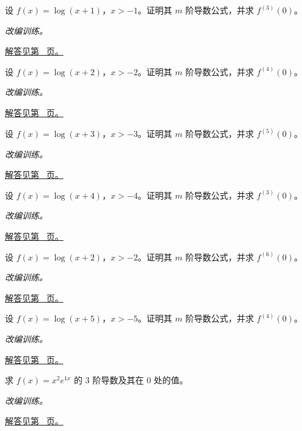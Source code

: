 \documentclass[UTF8,12pt,a4paper,fontset=fandol]{ctexart}
\begin{document}
\begin{example}[对数的高阶导数]\label{ex:c9q13}
设 $f(x)=\log(x+1)$，$x>-1$。证明其 $m$ 阶导数公式，并求 $f^{(3)}(0)$。
\par\textit{改编训练。}\par\hyperref[ans:c9q13]{解答见第~\pageref{ans:c9q13} 页。}
\end{example}
\begin{example}[对数的高阶导数]\label{ex:c9q14}
设 $f(x)=\log(x+2)$，$x>-2$。证明其 $m$ 阶导数公式，并求 $f^{(4)}(0)$。
\par\textit{改编训练。}\par\hyperref[ans:c9q14]{解答见第~\pageref{ans:c9q14} 页。}
\end{example}
\begin{example}[对数的高阶导数]\label{ex:c9q15}
设 $f(x)=\log(x+3)$，$x>-3$。证明其 $m$ 阶导数公式，并求 $f^{(5)}(0)$。
\par\textit{改编训练。}\par\hyperref[ans:c9q15]{解答见第~\pageref{ans:c9q15} 页。}
\end{example}
\begin{example}[对数的高阶导数]\label{ex:c9q16}
设 $f(x)=\log(x+4)$，$x>-4$。证明其 $m$ 阶导数公式，并求 $f^{(3)}(0)$。
\par\textit{改编训练。}\par\hyperref[ans:c9q16]{解答见第~\pageref{ans:c9q16} 页。}
\end{example}
\begin{example}[对数的高阶导数]\label{ex:c9q17}
设 $f(x)=\log(x+2)$，$x>-2$。证明其 $m$ 阶导数公式，并求 $f^{(6)}(0)$。
\par\textit{改编训练。}\par\hyperref[ans:c9q17]{解答见第~\pageref{ans:c9q17} 页。}
\end{example}
\begin{example}[对数的高阶导数]\label{ex:c9q18}
设 $f(x)=\log(x+5)$，$x>-5$。证明其 $m$ 阶导数公式，并求 $f^{(4)}(0)$。
\par\textit{改编训练。}\par\hyperref[ans:c9q18]{解答见第~\pageref{ans:c9q18} 页。}
\end{example}
\begin{example}\label{ex:c9q19}
求 $f(x)=x^2e^{1x}$ 的 $3$ 阶导数及其在 $0$ 处的值。
\par\textit{改编训练。}\par\hyperref[ans:c9q19]{解答见第~\pageref{ans:c9q19} 页。}
\end{example}
\end{document}
